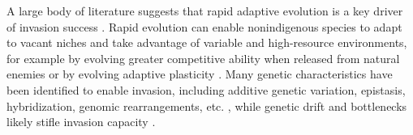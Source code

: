 \documentclass[12pt]{article}\usepackage[]{graphicx}\usepackage[]{color}
\begin{document}
	A large body of literature suggests that rapid adaptive evolution is a key driver of invasion success  \parencite{Sakai2001,Reznick2001, Lambrinos2004,Williamson1997,Thompson1998, Cox2004, Prentis2008,Colautti2015,Lee2002invasion, Fenollosa2019,Clements2011}.  Rapid evolution can enable nonindigenous species to adapt to vacant niches and take advantage of variable and high-resource environments, for example by evolving greater competitive ability  when released from natural enemies \parencite{Blossey1995,Bossdorf2005} or by evolving adaptive plasticity \parencite{Richards2006}. Many genetic characteristics have been identified to enable invasion, including additive genetic variation, epistasis, hybridization, genomic rearrangements, etc. \parencite[Reviewed in][]{Lee2002invasion}, while genetic drift and bottlenecks likely stifle invasion capacity \parencite{Bock2015}. 
	
\end{document}
